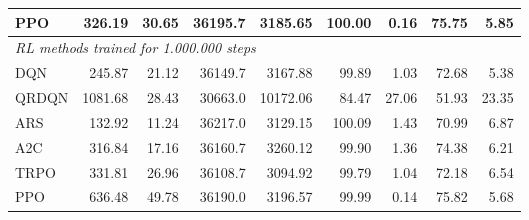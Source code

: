 \begin{samepage}
\begin{center}
\begin{tabular}{l|rr|rr|rr|rr}
    PPO          &   326.19 &    30.65 &    36195.7 &    3185.65 &  100.00 &    0.16 &   75.75 &    5.85 \\
    \midrule
    \multicolumn{9}{l}{\textit{RL methods trained for 1.000.000 steps}} \\
    \midrule
    DQN          &   245.87 &    21.12 &    36149.7 &    3167.88 &   99.89 &    1.03 &   72.68 &    5.38 \\
    QRDQN        &  1081.68 &    28.43 &    30663.0 &   10172.06 &   84.47 &   27.06 &   51.93 &   23.35 \\
    ARS          &   132.92 &    11.24 &    36217.0 &    3129.15 &  100.09 &    1.43 &   70.99 &    6.87 \\
    A2C          &   316.84 &    17.16 &    36160.7 &    3260.12 &   99.90 &    1.36 &   74.38 &    6.21 \\
    TRPO         &   331.81 &    26.96 &    36108.7 &    3094.92 &   99.79 &    1.04 &   72.18 &    6.54 \\
    PPO          &   636.48 &    49.78 &    36190.0 &    3196.57 &   99.99 &    0.14 &   75.82 &    5.68 \\
    \bottomrule
  \end{tabular}
\end{center}
\end{samepage}

